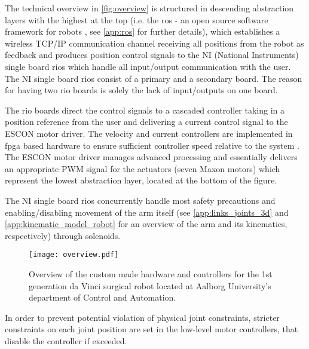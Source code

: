 %
%
The technical overview in \autoref{fig:overview} is structured in descending abstraction layers with the highest at the top (i.e. the \gls{ros} - an open source software framework for robots \citep{bib:ros}, see \autoref{app:ros} for further details), which establishes a wireless TCP/IP communication channel receiving all positions from the robot as feedback and produces position control signals to the NI (National Instruments) single board \glspl{rio} which handle all input/output communication with the user. The NI single board \glspl{rio} consist of a primary and a secondary board. The reason for having two \gls{rio} boards is solely the lack of input/outputs on one board.

The \gls{rio} boards direct the control signals to a cascaded controller taking in a position reference from the user and delivering a current control signal to the ESCON motor driver. The velocity and current controllers are implemented in \gls{fpga} based hardware to ensure sufficient controller speed relative to the system \citep{bib:robot_paper}. The ESCON motor driver manages advanced processing and essentially delivers an appropriate PWM signal for the actuators (seven Maxon motors) which represent the lowest abstraction layer, located at the bottom of the figure.

The NI single board \glspl{rio} concurrently handle most safety precautions and enabling/disabling movement of the arm itself (see \autoref{app:links_joints_3d} and \ref{app:kinematic_model_robot} for an overview of the arm and its kinematics, respectively) through solenoids.
\begin{figure}[H]
\hspace*{-5mm}
\texttt{[image: overview.pdf]}	
\caption{Overview of the custom made hardware and controllers for the 1st generation da Vinci surgical robot located at Aalborg University's department of Control and Automation.}
\label{fig:overview}
\end{figure}

In order to prevent potential violation of physical joint constraints, stricter constraints on each joint position are set in the low-level motor controllers, that disable the controller if exceeded.

